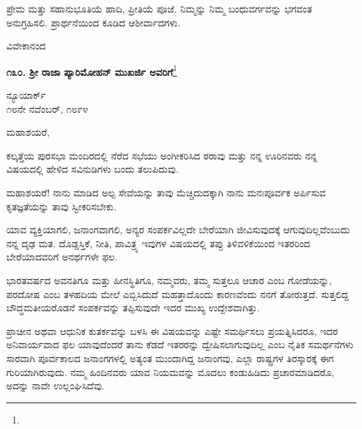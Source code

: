 ಪ್ರೇಮ ಮತ್ತು ಸಹಾನುಭೂತಿಯೆ ಹಾದಿ, ಪ್ರೀತಿಯೆ ಪೂಜೆ. ನಿಮ್ಮನ್ನು ನಿಮ್ಮ ಬಂಧುವರ್ಗವನ್ನು ಭಗವಂತ ಅನುಗ್ರಹಿಸಲಿ. ಪ್ರಾರ್ಥನೆಯಿಂದ ಕೂಡಿದ ಆಶೀರ್ವಾದಗಳು.

{\flushright
ವಿವೇಕಾನಂದ\par}

\begin{center}
\textbf{೧೩೦. ಶ‍್ರೀ ರಾಜಾ ಪ್ಯಾರಿಮೋಹನ್ ಮುಖರ್ಜಿ ಅವರಿಗೆ}\footnote{}
\end{center}

\begin{flushright}
ನ್ಯೂಯಾರ್ಕ್\\೧೮ನೇ ನವೆಂಬರ್, ೧೮೯೪
\end{flushright}

\noindent
ಮಹಾಶಯರೆ,

\vspace{0.1cm}

ಕಲ್ಕತ್ತೆಯ ಪುರಸಭಾ ಮಂದಿರದಲ್ಲಿ ನೆರೆದ ಸಭೆಯು ಅಂಗೀಕರಿಸಿದ ಠರಾವು ಮತ್ತು ನನ್ನ ಊರಿನವರು ನನ್ನ ವಿಷಯದಲ್ಲಿ ಹೇಳಿದ ಸವಿನುಡಿಗಳು ಬಂದು ತಲುಪಿದುವು.

\vspace{0.1cm}

ಮಹಾಶಯರೆ! ನಾನು ಮಾಡಿದ ಅಲ್ಪ ಸೇವೆಯನ್ನು ತಾವು ಮೆಚ್ಚಿದುದಕ್ಕಾಗಿ ನಾನು ಮನಃಪೂರ್ವಕ ಅರ್ಪಿಸುವ ಕೃತಜ್ಞತೆಯನ್ನು ತಾವು ಸ್ವೀಕರಿಸಬೇಕು.

\vspace{0.1cm}

ಯಾವ ವ್ಯಕ್ತಿಯಾಗಲಿ, ಜನಾಂಗವಾಗಲಿ, ಅನ್ಯರ ಸಂಪರ್ಕವಿಲ್ಲದೇ ಬೇರೆಯಾಗಿ ಜೀವಿಸುವುದಕ್ಕೆ ಆಗುವುದಿಲ್ಲವೆಂಬುದು ನನ್ನ ದೃಢ ಮತ. ದೊಡ್ಡಸ್ತಿಕೆ, ನೀತಿ, ಪಾವಿತ್ರ್ಯ ಇವುಗಳ ವಿಷಯದಲ್ಲಿ ತಪ್ಪು ತಿಳಿವಳಿಕೆಯಿಂದ ಇತರರಿಂದ ಬೇರೆಯಾದವರಿಗೆ ಅನರ್ಥಗಳೇ ಫಲ.

\vspace{0.1cm}

ಭಾರತವರ್ಷದ ಅವನತಿಗೂ ಮತ್ತು ಹೀನಸ್ಥಿತಿಗೂ, ನಮ್ಮವರು, ತಮ್ಮ ಸುತ್ತಲೂ ಆಚಾರ ಎಂಬ ಗೋಡೆಯನ್ನು, ಪರದೋಷ ಎಂಬ ತಳಹದಿಯ ಮೇಲೆ ಎಬ್ಬಿಸಿದುದೆ ಮಹತ್ತಾದೊಂದು ಕಾರಣವೆಂದು ನನಗೆ ತೋರುತ್ತದೆ. ಸುತ್ತಲಿದ್ದ ಬೌದ್ಧಮತೀಯರೊಡನೆ ಸಂಪರ್ಕವನ್ನು ತಪ್ಪಿಸುವುದೇ ಇದರ ಮುಖ್ಯ ಉದ್ದೇಶವಾಗಿತ್ತು.

\vspace{0.1cm}

ಪ್ರಾಚೀನ ಅಥವಾ ಆಧುನಿಕ ಕುತರ್ಕವನ್ನು ಬಳಸಿ ಈ ವಿಷಯವನ್ನು ಎಷ್ಟೇ ಸಮರ್ಥಿಸಲು ಪ್ರಯತ್ನಿಸಿದರೂ, ಇದರ ಅನಿವಾರ್ಯವಾದ ಫಲ ಯಾವುದೆಂದರೆ\enginline{-} ತಾನು ಕೆಡದೆ ಇತರರನ್ನು ದ್ವೇಷಿಸಲಾಗುವುದಿಲ್ಲ ಎಂಬ ನೈತಿಕ ಸಮರ್ಥನೆಗಳು ಸಾರವಾಗಿ\enginline{-} ಪೂರ್ವಕಾಲದ ಜನಾಂಗಗಳಲ್ಲಿ ಅತ್ಯಂತ ಮುಂದಾಗಿದ್ದ ಜನಾಂಗವು, ಎಲ್ಲಾ ರಾಷ್ಟ್ರಗಳ ತಿರಸ್ಕಾರಕ್ಕೆ ಈಗ ಗುರಿಯಾಗಿರುವುದು. ನಮ್ಮ ಹಿಂದಿನವರು ಯಾವ ನಿಯಮವನ್ನು ಮೊದಲು ಕಂಡುಹಿಡಿದು ಪ್ರಚಾರಮಾಡಿದರೊ, ಅದನ್ನು ನಾವೇ ಉಲ್ಲಂಘಿಸಿದೆವು.

\vspace{0.1cm}

